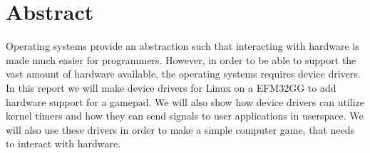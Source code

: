 	\section{Abstract}

Operating systems provide an abstraction such that interacting with hardware is made much easier for programmers. However, in order to be able to support the vast amount of hardware available, the operating systems requires device drivers. In this report we will make device drivers for Linux on a EFM32GG to add hardware support for a gamepad. We will also show how device drivers can utilize kernel timers and how they can send signals to user applications in userspace. We will also use these drivers in order to make a simple computer game, that needs to interact with hardware. 